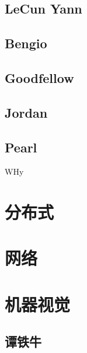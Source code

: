 \subsection{LeCun Yann}

\subsection{Bengio}

\subsection{Goodfellow}

\subsection{Jordan}

\subsection{Pearl}
WHy


\subsection{ }

\section{分布式}

\section{网络 }

\section{机器视觉}

\subsection{谭铁牛}

